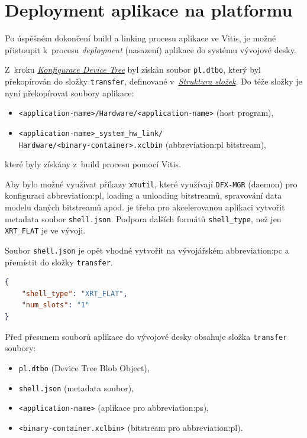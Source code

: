 \documentclass[a4paper, twoside, 11pt]{article}
\begin{document}
		

	
	\section{Deployment aplikace na platformu}
	Po úspěšném dokončení build a linking procesu aplikace ve Vitis, je možné přistoupit k~procesu \textit{deployment} (nasazení) aplikace do systému vývojové desky.\par
	Z~kroku \hyperref[subsubsec:konfigurace-device-tree]{\textit{Konfigurace Device Tree}} byl získán soubor \texttt{pl.dtbo}, který byl překopírován do složky \texttt{transfer}, definované v~\hyperref[sec:struktura-slozek]{\textit{Struktura složek}}. Do téže složky je nyní překopírovat soubory aplikace:
	\begin{itemize}
		\item \texttt{<application-name>/Hardware/<application-name>} (host program),
		\item \texttt{<application-name>\_system\_hw\_link/\\Hardware/<binary-container>.xclbin} (\gls{abbreviation:pl} bitstream),
	\end{itemize}
	které byly získány z~build procesu pomocí Vitis.\par
	Aby bylo možné využívat příkazy \texttt{xmutil}, které využívají \texttt{DFX-MGR} (daemon) \cite{xilinx-github-dfx-mgr} pro konfiguraci \gls{abbreviation:pl}, loading a unloading bitstreamů, spravování data modelu daných bitstreamů apod. je třeba pro akcelerovanou aplikaci vytvořit metadata soubor \texttt{shell.json}. Podpora dalších formátů \texttt{shell\_type}, než jen \texttt{XRT\_FLAT} je ve vývoji. \cite{xilinx-github-vitis-tutorials-step-2-create-the-software-components}\par
	Soubor \texttt{shell.json} je opět vhodné vytvořit na vývojářském \gls{abbreviation:pc} a přemístit do složky \texttt{transfer}.\par

	\begin{lstlisting}[language={json}, caption={Metadata shell.json soubor pro xmutil.}, label={lst:metadata-shell-json}]
{
	"shell_type": "XRT_FLAT",
	"num_slots": "1"
}\end{lstlisting}
	
	\vspace*{0.35cm}
	Před přesunem souborů aplikace do vývojové desky obsahuje složka \texttt{transfer} soubory:
	\begin{itemize}
		\item \texttt{pl.dtbo} (Device Tree Blob Object),
		\item \texttt{shell.json} (metadata soubor),
		\item \texttt{<application-name>} (aplikace pro \gls{abbreviation:ps}),
		\item \texttt{<binary-container.xclbin>} (bitstream pro \gls{abbreviation:pl}). 
	\end{itemize}
	\vspace*{0.75cm}
\end{document}
